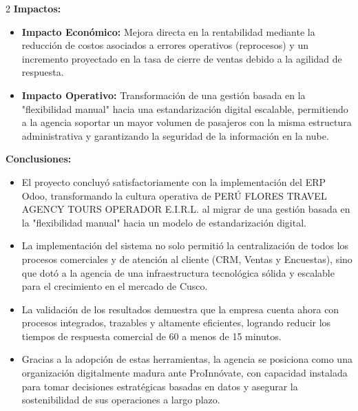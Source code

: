 \documentclass[12pt]{article}
\begin{document}
\begin{multicols}{2}
\textbf{Impactos:}
\begin{itemize}
    \item \textbf{Impacto Económico:} Mejora directa en la rentabilidad mediante la reducción de costos asociados a errores operativos (reprocesos) y un incremento proyectado en la tasa de cierre de ventas debido a la agilidad de respuesta.
    \item \textbf{Impacto Operativo:} Transformación de una gestión basada en la "flexibilidad manual" hacia una estandarización digital escalable, permitiendo a la agencia soportar un mayor volumen de pasajeros con la misma estructura administrativa y garantizando la seguridad de la información en la nube.
\end{itemize}

\textbf{Conclusiones:}
\begin{itemize}
    \item El proyecto concluyó satisfactoriamente con la implementación del ERP Odoo, transformando la cultura operativa de PERÚ FLORES TRAVEL AGENCY TOURS OPERADOR E.I.R.L. al migrar de una gestión basada en la "flexibilidad manual" hacia un modelo de estandarización digital.
    \item La implementación del sistema no solo permitió la centralización de todos los procesos comerciales y de atención al cliente (CRM, Ventas y Encuestas), sino que dotó a la agencia de una infraestructura tecnológica sólida y escalable para el crecimiento en el mercado de Cusco.
    \item La validación de los resultados demuestra que la empresa cuenta ahora con procesos integrados, trazables y altamente eficientes, logrando reducir los tiempos de respuesta comercial de 60 a menos de 15 minutos.
    \item Gracias a la adopción de estas herramientas, la agencia se posiciona como una organización digitalmente madura ante ProInnóvate, con capacidad instalada para tomar decisiones estratégicas basadas en datos y asegurar la sostenibilidad de sus operaciones a largo plazo.
\end{itemize}

\vspace{0.4cm}
\noindent
\scriptsize
\renewcommand{\arraystretch}{1.15}
\setlength{\tabcolsep}{3pt}
\normalsize


\end{multicols}
\end{document}
